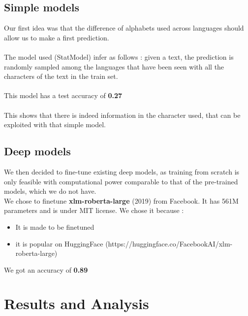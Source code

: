 \documentclass[11pt]{article}
\begin{document}
\subsection{Simple models}
Our first idea was that the difference of alphabets used across languages should allow us to make a first prediction.
\\
\\
The model used (StatModel) infer as follows :
given a text, the prediction is randomly sampled among the languages that have been seen with all the characters of the text in the train set.
\\\\
This model has a test accuracy of \textbf{0.27}
\\\\
This shows that there is indeed information in the character used, that can be exploited with that simple model.

\subsection{Deep models}
We then decided to fine-tune existing deep models, as training from scratch is only feasible with computational power comparable to that of the pre-trained models, which we do not have.
\\
We chose to finetune \textbf{xlm-roberta-large} (2019) from Facebook. It has 561M parameters and is under MIT license. We chose it because :
\begin{itemize}[noitemsep, topsep=0pt]
    \item It is made to be finetuned
    \item it is popular on HuggingFace (https://huggingface.co/FacebookAI/xlm-roberta-large)
\end{itemize}

We got an accuracy of \textbf{0.89}

\section{Results and Analysis}















\end{document}
